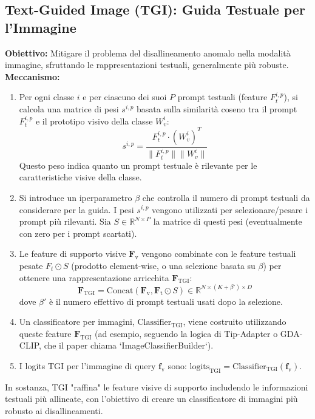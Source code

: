 \documentclass[11pt,a4paper]{article}
\newcommand{\Ft}{\mathbf{F}_\text{t}}      %
\newcommand{\Fv}{\mathbf{F}_\text{v}}      %
\newcommand{\fv}{\mathbf{f}_\text{v}}      %
\newcommand{\Ftgi}{\mathbf{F}_\text{TGI}}  %
\newcommand{\R}{\mathbb{R}}
\begin{document}
\subsection{Text-Guided Image (TGI): Guida Testuale per l'Immagine}
\textbf{Obiettivo:} Mitigare il problema del disallineamento anomalo nella modalità immagine, sfruttando le rappresentazioni testuali, generalmente più robuste.
\textbf{Meccanismo:}
\begin{enumerate}
    \item Per ogni classe $i$ e per ciascuno dei suoi $P$ prompt testuali (feature $F_t^{i,p}$), si calcola una matrice di pesi $s^{i,p}$ basata sulla similarità coseno tra il prompt $F_t^{i,p}$ e il prototipo visivo della classe $W_v^i$:
    \[ s^{i,p} = \frac{F_t^{i,p} \cdot (W_v^i)^T}{\|F_t^{i,p}\| \|W_v^i\|} \]
    Questo peso indica quanto un prompt testuale è rilevante per le caratteristiche visive della classe.
    \item Si introduce un iperparametro $\beta$ che controlla il numero di prompt testuali da considerare per la guida. I pesi $s^{i,p}$ vengono utilizzati per selezionare/pesare i prompt più rilevanti. Sia $S \in \R^{N \times P}$ la matrice di questi pesi (eventualmente con zero per i prompt scartati).
    \item Le feature di supporto visive $\Fv$ vengono combinate con le feature testuali pesate $F_t \odot S$ (prodotto element-wise, o una selezione basata su $\beta$) per ottenere una rappresentazione arricchita $\Ftgi$:
    \[ \Ftgi = \text{Concat}(\Fv, \Ft \odot S) \in \R^{N \times (K+\beta') \times D} \]
    dove $\beta'$ è il numero effettivo di prompt testuali usati dopo la selezione.
    \item Un classificatore per immagini, $\text{Classifier}_{\text{TGI}}$, viene costruito utilizzando queste feature $\Ftgi$ (ad esempio, seguendo la logica di Tip-Adapter o GDA-CLIP, che il paper chiama `ImageClassifierBuilder`).
    \item I logits TGI per l'immagine di query $\fv$ sono: $\text{logits}_{\text{TGI}} = \text{Classifier}_{\text{TGI}}(\fv)$.
\end{enumerate}
In sostanza, TGI "raffina" le feature visive di supporto includendo le informazioni testuali più allineate, con l'obiettivo di creare un classificatore di immagini più robusto ai disallineamenti.
\end{document}
